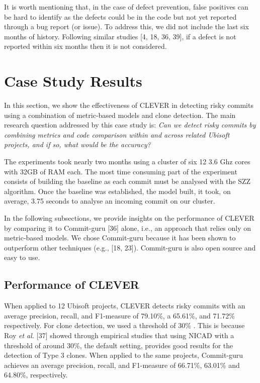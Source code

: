 \documentclass[sigconf]{acmart}
\begin{document}
It is worth mentioning that, in the case of defect prevention, false
positives can be hard to identify as the defects could be in the code
but not yet reported through a bug report (or issue). To address this,
we did not include the last six months of history. Following similar
studies [4, 18, 36, 39], if a defect is not reported within six
months then it is not considered.

\section{Case Study Results}\label{sec:result}

In this section, we show the effectiveness of CLEVER in detecting risky
commits using a combination of metric-based models and clone detection.
The main research question addressed by this case study is: \emph{Can we
detect risky commits by combining metrics and code comparison within and
across related Ubisoft projects, and if so, what would be the accuracy?}

The experiments took nearly two months using a cluster of six 12 3.6 Ghz
cores with 32GB of RAM each. The most time consuming part of the
experiment consists of building the baseline as each commit must be
analysed with the SZZ algorithm. Once the baseline was established, the
model built, it took, on average, 3.75 seconds to analyse an incoming
commit on our cluster.

In the following subsections, we provide insights on the performance of
CLEVER by comparing it to Commit-guru [36] alone, i.e., an approach
that relies only on metric-based models. We chose Commit-guru because it
has been shown to outperform other techniques (e.g., [18, 23]).
Commit-guru is also open source and easy to use.

\subsection{Performance of CLEVER}\label{performance-of-clever}

When applied to 12 Ubisoft projects, CLEVER detects risky commits with
an average precision, recall, and F1-measure of 79.10\%, a 65.61\%, and
71.72\% respectively. For clone detection, we used a threshold of 30\% .
This is because Roy \emph{et al.} [37] showed through empirical
studies that using NICAD with a threshold of around 30\%, the default
setting, provides good results for the detection of Type 3 clones. When
applied to the same projects, Commit-guru achieves an average precision,
recall, and F1-measure of 66.71\%, 63.01\% and 64.80\%, respectively.
\end{document}
